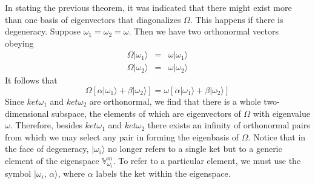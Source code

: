 \documentclass[11pt,fleqn]{book} %
\newcommand{\ket}[1]{| #1\rangle}
\begin{document}
In stating the previous theorem, it was indicated that there might exist more than one basis of eigenvectors that diagonalizes
$\Omega$. This happens if there is degeneracy. Suppose $\omega_1=\omega_2=\omega$. Then we have two orthonormal vectors obeying
\begin{eqnarray*}
    \Omega\ket{\omega_1} &=& \omega\ket{\omega_1} \\
    \Omega\ket{\omega_2} &=& \omega\ket{\omega_2}
\end{eqnarray*} 
It follows that 
\begin{equation*}
    \Omega\left[\alpha\ket{\omega_1}+\beta\ket{\omega_2}\right]=\omega\left[\alpha\ket{\omega_1}+\beta\ket{\omega_2}\right]
\end{equation*}
Since $ket{\omega_1}$ and $ket{\omega_2}$ are orthonormal, we find that there is a whole two-dimensional subspace, the elements
of which are eigenvectors of $\Omega$ with eigenvalue $\omega$. Therefore, besides $ket{\omega_1}$ and $ket{\omega_2}$ there exists an 
infinity of orthonormal pairs from which we may select any pair in forming the eigenbasis of $\Omega$.
Notice that in the face of degeneracy, $\ket{\omega_i}$ no longer refers to a single ket but
to a generic element of the eigenspace $\mathbb{V}^m_{\omega_i}$. To refer to a particular element, we must
use the symbol $\ket{\omega_i,\,\alpha}$, where $\alpha$ labels the ket within the eigenspace.
\end{document}
